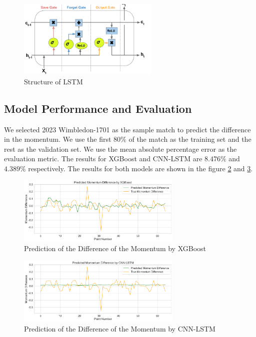 \documentclass[12pt]{article}
\begin{document}
\begin{figure}[h!]
    \centering
    \includegraphics[width=0.6\textwidth, height=0.4\textwidth]{LSTM.png}
    \caption{Structure of LSTM\cite{graph-tennis}} 
    \label{fig:15}
\end{figure}

\subsection{Model Performance and Evaluation}
We selected 2023 Wimbledon-1701 as the sample match to predict the difference in the momentum. We use the first 80\% of the match as the training set and the rest as the validation set.
We use the mean absolute percentage error as the evaluation metric. The results for XGBoost and CNN-LSTM are $8.476\%$ and $4.389\%$ respectively. The results for both models are shown in the figure  \ref{fig:8} and \ref{fig:9}.
\begin{figure}[h!]
    \centering
    \includegraphics[width=0.7\textwidth, height=0.3\textwidth]{XGboost_part_3.png}
    \caption{Prediction of the Difference of the Momentum by XGBoost}
    \label{fig:8}
\end{figure}

\begin{figure}[h!]
    \centering
    \includegraphics[width=0.7\textwidth, height=0.3\textwidth]{CNNLSTM_part_3.png}
    \caption{Prediction of the Difference of the Momentum by CNN-LSTM}
    \label{fig:9}
\end{figure}
\end{document}
